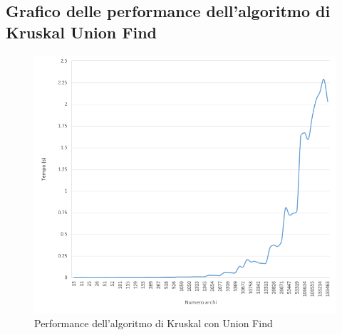 \subsection{Grafico delle performance dell'algoritmo di Kruskal Union Find}
	\begin{figure}[H]
	 	\hspace{-1cm}\includegraphics[width=18.5cm]{Img/kruskal_uf_result.png}
		\caption{Performance dell'algoritmo di Kruskal con Union Find}
	\end{figure}


\pagebreak